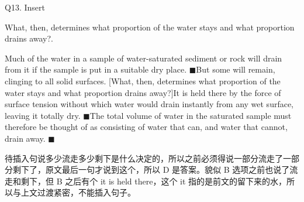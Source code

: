 \begin{blk}
  \begin{qst}
    Q13. Insert
  \end{qst}

  \begin{chc}
    What, then, determines what proportion of the water stays and what proportion drains away?.
  \end{chc}

  \begin{psgq}
    Much of the water in a sample of water-saturated sediment or rock will drain from it if the sample is put in a suitable dry place. $\blacksquare$But some will remain, clinging to all solid surfaces. [What, then, determines what proportion of the water stays and what proportion drains away?]It is held there by the force of surface tension without which water would drain instantly from any wet surface, leaving it totally dry. $\blacksquare$The total volume of water in the saturated sample must therefore be thought of as consisting of water that can, and water that cannot, drain away. $\blacksquare$
  \end{psgq}

  \begin{nlz}
    待插入句说多少流走多少剩下是什么决定的，所以之前必须得说一部分流走了一部分剩下了，原文最后一句才说到这个，所以 D 是答案。貌似 B 选项之前也说了流走和剩下，但 B 之后有个 it is held there，这个 it 指的是前文的留下来的水，所以与上文过渡紧密，不能插入句子。
  \end{nlz}
\end{blk}


